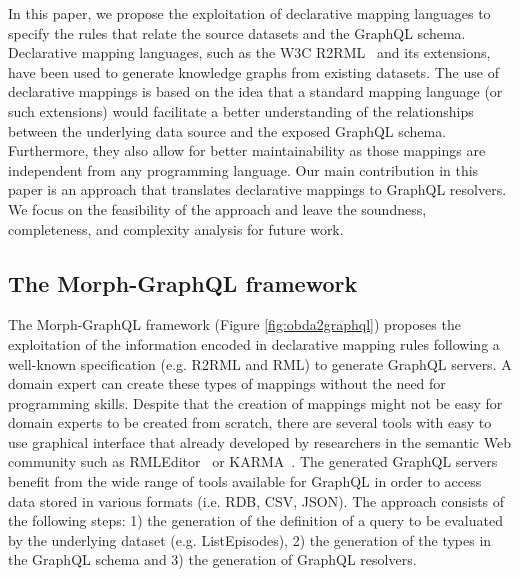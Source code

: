 In this paper, we propose the exploitation of declarative mapping languages to specify the rules that relate the source datasets and the GraphQL schema. Declarative mapping languages, such as the W3C R2RML~\citep{R2RML} and its extensions, have been used to generate knowledge graphs from existing datasets. The use of declarative mappings is based on the idea that a standard mapping language (or such extensions) would facilitate a better understanding of the relationships between the underlying data source and the exposed GraphQL schema. Furthermore, they also allow for better maintainability as those mappings are independent from any programming language. Our main contribution in this paper is an approach that translates declarative mappings to GraphQL resolvers. We focus on the feasibility of the approach and leave the soundness, completeness, and complexity analysis for future work.

\subsection{The Morph-GraphQL framework}
The Morph-GraphQL framework (Figure \ref{fig:obda2graphql}) proposes the exploitation of the information encoded in declarative mapping rules following a well-known specification (e.g. R2RML and RML) to generate GraphQL servers. A domain expert can create these types of mappings without the need for programming skills. Despite that the creation of mappings might not be easy for domain experts to be created from scratch, there are several tools with easy to use graphical interface that already developed by researchers in the semantic Web community such as RMLEditor~\citep{heyvaert2016rmleditor} or KARMA~\citep{knoblock2015exploiting}. The generated GraphQL servers benefit from the wide range of tools available for GraphQL in order to access data stored in various formats (i.e. RDB, CSV, JSON). The approach consists of the following steps: 1) the generation of the definition of a query to be evaluated by the underlying dataset (e.g. ListEpisodes), 2) the generation of the types in the GraphQL schema and 3) the generation of GraphQL resolvers. 


